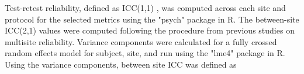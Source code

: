 Test-retest reliability, defined as ICC(1,1) \cite{fmriReliability}, was computed across each site and protocol for the selected metrics using the "psych" package in R. The between-site ICC(2,1) values were computed following the procedure from previous studies on multisite reliability\cite{fmriReliability,cannon2014}. Variance components were calculated for a fully crossed random effects model for subject, site, and run using the "lme4" package in R. Using the variance components, between site ICC was defined as